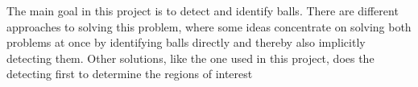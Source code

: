 The main goal in this project is to detect and identify balls. There are different approaches to solving this problem, where some ideas concentrate on solving both problems at once by identifying balls directly and thereby also implicitly detecting them. Other solutions, like the one used in this project, does the detecting first to determine the regions of interest 